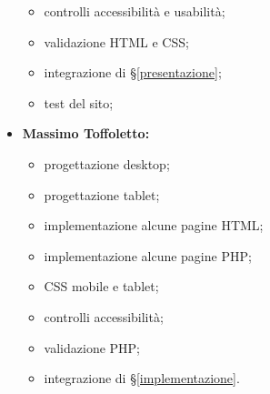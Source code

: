 \begin{itemize}
\begin{itemize}
			\item controlli accessibilità e usabilità;
			\item validazione HTML e CSS;
			\item integrazione di §\ref{presentazione};
			\item test del sito;
		\end{itemize}
	\item \textbf{Massimo Toffoletto:}
		\begin{itemize}
			\item progettazione desktop;
			\item progettazione tablet;
			\item implementazione alcune pagine HTML;
			\item implementazione alcune pagine PHP;
			\item CSS mobile e tablet;
			\item controlli accessibilità;
			\item validazione PHP;
			\item integrazione di §\ref{implementazione}.
		\end{itemize}
\end{itemize}